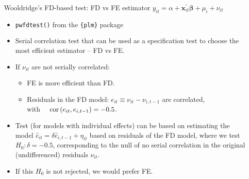 \documentclass{beamer}
\begin{document}
\begin{frame}{Wooldridge's FD-based test: FD vs FE estimator}
$y_{it} = \alpha + \bm{x}^{\prime}_{it} \bm{\beta} + \mu_i + \nu_{it}$\\ \medskip
\begin{itemize}
    \item \texttt{pwfdtest()} from the \texttt{\{plm\}} package
    \smallskip
    \item Serial correlation test that can be used as a specification test to choose the most efficient estimator -- FD vs FE.
    \item If $\nu_{it}$ are not serially correlated: 
    \begin{itemize}
          \item FE is more efficient than FD.
          \item Residuals in the FD model: $e_{it} \equiv \nu_{it}-\nu_{i,t-1}$ are correlated, \\with~~ $\textnormal{cor}\left(e_{it},e_{i,t-1}\right)=-0.5$.
        \end{itemize}
        \item Test (for models with individual effects) can be based on estimating the model $\hat{e}_{it}=\delta \hat{e}_{i,t-1}+\eta_{it}$ based on residuals of the FD model, where we test $H_0: \delta=-0.5$, corresponding to the null of no serial correlation in the original (undifferenced) residuals $\nu_{it}$. 
        \item If this $H_0$ is not rejected, we would prefer FE.
\end{itemize}
\end{frame}
\end{document}
